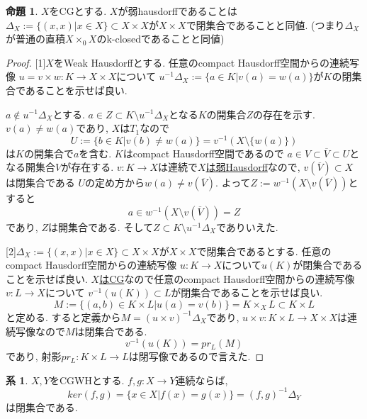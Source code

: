 \documentclass[dvipdfmx,a4paper,11pt]{article}
\theoremstyle{definition}
\newtheorem{prop}[thm]{命題}
\newtheorem{cor}[thm]{系}
\begin{document}
 \begin{tcolorbox}
 [colback = white, colframe = green!35!black, fonttitle = \bfseries,breakable = true]
\begin{prop}\cite[Prop2.14]{Str}
\label{Str-prop2.14}
$X$をCGとする.
$X$が弱hausdorffであることは
$\Delta_X := \{ (x,x)| x \in X\}\subset X \times X$が$X \times X$で閉集合であることと同値.
(つまり$\Delta_X$が普通の直積$X \times_0 X$のk-closedであることと同値)
\end{prop}
\end{tcolorbox}

\begin{proof}

[1]$X$をWeak Hausdorffとする. 
任意のcompact Hausdorff空間からの連続写像
$u = v \times w : K \to X \times X$について
$u^{-1}\Delta_X := \{a \in K | v(a)=w(a) \}$が$K$の閉集合であることを示せば良い.

$a \not \in u^{-1}\Delta_X$とする.
$a \in Z \subset  K \setminus u^{-1}\Delta_X$となる$K$の開集合$Z$の存在を示す. 
$v(a) \neq w(a)$であり, $X$は$T_1$なので
$$
U:= \{ b \in K | v(b) \neq w(a) \} = v^{-1}(X \setminus \{w(a)\})
$$
は$K$の開集合で$a$を含む.
$K$はcompact Hausdorff空間であるので
$a \in V \subset \overline{V} \subset U$となる開集合$V$が存在する.
$v : K \to X$は連続で\underline{$X$は弱Hausdorff}なので, $v(\overline{V}) \subset X$は閉集合である
$U$の定め方から$w(a) \neq v(\overline{V})$. よって$Z:=w^{-1}( X \setminus v(\overline{V}) )$とすると
$$
a \in w^{-1}( X \setminus v(\overline{V}) ) = Z
$$
であり,  $Z$は開集合である. 
そして$Z\subset K \setminus u^{-1}\Delta_X$でありいえた.

[2]$\Delta_X := \{ (x,x)| x \in X\}\subset X \times X$が$X \times X$で閉集合であるとする. 
任意のcompact Hausdorff空間からの連続写像
$u : K \to X$について$u(K)$が閉集合であることを示せば良い.
\underline{$X$はCG}なので任意のcompact Hausdorff空間からの連続写像$v : L \to X$について
$v^{-1}(u(K)) \subset L$が閉集合であることを示せば良い.
$$
M := \{ (a,b) \in K \times L | u(a) =v(b)\}=K\times_{X}L \subset K \times L
$$
と定める. 
すると定義から$M = (u \times v)^{-1}\Delta_{X}$であり, 
$u \times v : K \times L \to X \times X$は連続写像なので$M$は閉集合である. 
$$
v^{-1}(u(K)) = pr_{L}(M)
$$
であり, 射影$pr_{L} : K \times L \to L$は閉写像であるので言えた. 
\end{proof}

 \begin{tcolorbox}
 [colback = white, colframe = green!35!black, fonttitle = \bfseries,breakable = true]
\begin{cor}\cite[Cor2.15]{Str}
\label{Str-cor2.15}
$X,Y$をCGWHとする. 
$f,g : X \to Y$連続ならば, 
$$
ker(f,g)=\{x \in X | f(x)=g(x) \}= (f, g)^{-1}\Delta_{Y}
$$
は閉集合である.
\end{cor}
\end{tcolorbox}
\end{document}

